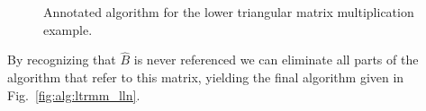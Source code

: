 \renewcommand{\afterupdate}{
\FlaTwoByOne{ 
B_0
}
{
\FlaTwoByOneSingleLine{ b_1^T }{ B_2 }
} =
\FlaTwoByOne{ 
\hat{B}_0
}
{
\FlaTwoByOneSingleLine{ \lambda_{11} \hat{b}_1^T }{ l_{21} \hat{b}_1^T + L_{22} \hat{B}_2 }
}
\wedge \ldots
}

\renewcommand{\update}{
\begin{minipage}[t]{4in}
\noindent
$ B_2 \becomes l_{21} b_1^T + B_2 $\\
$ b_1^T \becomes \lambda_{11} b_1^T $\\
\end{minipage}
}


\begin{figure}[htbp]
\worksheet
\caption{Annotated algorithm for the lower triangular
matrix multiplication example.}
\label{fig:ws:ltrmm_lln}
\end{figure}

By recognizing that $ \hat{B} $ is never referenced we can eliminate
all parts of the algorithm that refer to this matrix, yielding the
final algorithm given in Fig.~\ref{fig:alg:ltrmm_lln}.


\renewcommand{\partitionings}{
$ 
B \rightarrow \FlaTwoByOne{ B_{T} }
                          { B_{B} }
$
and
$ 
L \rightarrow \FlaTwoByTwo{ L_{TL} }{ 0 }
                          { L_{BL} }{ L_{BR} }
$
}
\renewcommand{\partitionsizes}{
$ B_{B} $ has $ 0 $ rows
and $ L_{BR} $ is $ 0 \times 0 $
}

\renewcommand{\repartitionings}{
$ 
\FlaTwoByOne{ B_T }{ B_B } 
\rightarrow
\FlaThreeByOneT{ B_0 }{ b_1^T }{ B_2 }
$
and
$ \FlaTwoByTwo{ L_{TL} }{ 0 }
            { L_{BL} }{ L_{BR} }
\rightarrow
\FlaThreeByThreeTL{ L_{00} }{ 0 }{ 0 }
                { l_{10}^T }{ \lambda_{11} }{ 0 }
                { L_{20} }{ l_{21} }{ L_{22} }
$
}
\renewcommand{\repartitionsizes}{
$ b_1^T $ is a row 
and $ \lambda_{11} $ is a scalar
}

\renewcommand{\moveboundaries}{%
$ 
\FlaTwoByOne{ B_T }{ B_B } 
\leftarrow
\FlaThreeByOneB{ B_0 }{ b_1^T }{ B_2 }
$
and
$ \FlaTwoByTwo{ L_{TL} }{ 0 }
            { L_{BL} }{ L_{BR} }
\leftarrow
\FlaThreeByThreeBR{ L_{00} }{ 0 }{ 0 }
                { l_{10}^T }{ \lambda_{11} }{ 0 }
                { L_{20} }{ l_{21} }{ L_{22} }
$
}

